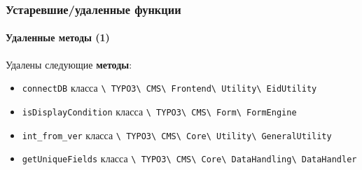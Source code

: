 \begin{frame}[fragile]
	\frametitle{Устаревшие/удаленные функции}
	\framesubtitle{Удаленные методы (1)}

	Удалены следующие \textbf{методы}:

	\begin{itemize}
		\item
			\small
				\texttt{connectDB}\newline
				класса
				\texttt{\textbackslash
					TYPO3\textbackslash
					CMS\textbackslash
					Frontend\textbackslash
					Utility\textbackslash
					EidUtility}
			\normalsize
		\item
			\small
				\texttt{isDisplayCondition}\newline
				класса
				\texttt{\textbackslash
					TYPO3\textbackslash
					CMS\textbackslash
					Form\textbackslash
					FormEngine}
			\normalsize
		\item
			\small
				\texttt{int\_from\_ver}\newline
				класса
				\texttt{\textbackslash
					TYPO3\textbackslash
					CMS\textbackslash
					Core\textbackslash
					Utility\textbackslash
					GeneralUtility}
			\normalsize
		\item
			\small
				\texttt{getUniqueFields}\newline
				класса
				\texttt{\textbackslash
					TYPO3\textbackslash
					CMS\textbackslash
					Core\textbackslash
					DataHandling\textbackslash
					DataHandler}
			\normalsize

	\end{itemize}

\end{frame}


